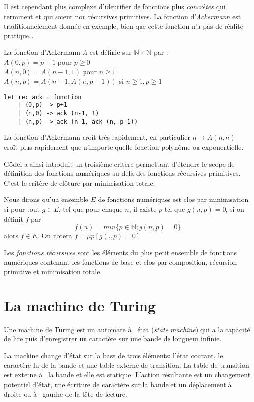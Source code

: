 Il est cependant plus complexe d'identifier de fonctions plus \textit{concrètes}
 qui terminent et qui soient non récursives primitives.
La fonction d'\textit{Ackermann} est traditionnelement donnée en exemple, bien que cette fonction n'a pas
de réalité pratique\dots

La fonction d’Ackermann $A$ est définie sur $\mathbb{N} × \mathbb{N}$ par : \\
$A(0, p) = p + 1$ pour $p ≥ 0$ \\
$A(n, 0) = A(n − 1, 1)$ pour $n ≥ 1$ \\
$A(n, p) = A(n − 1, A(n, p − 1))$ si $n ≥ 1, p ≥ 1$ \\ 

\begin{Verbatim}
let rec ack = function
	| (0,p) -> p+1
	| (n,0) -> ack (n-1, 1)
	| (n,p) -> ack (n-1, ack (n, p-1))
\end{Verbatim}

La fonction d’Ackermann croît très rapidement, en particulier $n \rightarrow A(n, n)$ croît
plus rapidement que n’importe quelle fonction polynôme ou exponentielle.

Gödel a ainsi introduit un troisième critère permettant d'étendre le scope de définition des
fonctions numériques au-delà des fonctions récursives primitives. C'est le critère
de clôture par minimisation totale.

Nous dirons qu'un ensemble $E$ de fonctions numériques est clos par minimisation si
pour tout $g \in E$, tel que pour chaque $n$, il existe $p$ tel que $g(n,p)=0$, si on définit
$f$ par
$$ f(n) = min\{p\in \mathbb{N} ; g(n,p) = 0   \} $$
alors $f\in E$. On notera $f =\mu p [g(.,p)=0]$.

Les  \textit{fonctions récursives} sont les éléments du plus petit ensemble de fonctions
numériques contenant les fonctions de base et clos par composition, récursion primitive et 
minimisation totale.

\section{La machine de Turing}
Une machine de Turing est un automate à  état (\textit{state machine}) qui a la
capacité de lire puis  d'enregistrer un caractère sur une bande de longueur
infinie. 

La machine change d'état sur la base de trois éléments: l'état courant,
le caractère lu de la bande et une table externe de transition. La table de
transition est externe à  la bande et elle est statique.
 L'action résultante est un changement potentiel d'état, une écriture de
 caractère sur la bande et un déplacement à  droite ou à  gauche de la tête de
 lecture.

